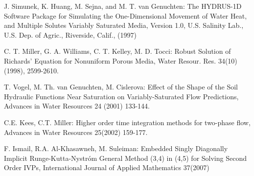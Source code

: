 \documentclass[final,3p,times,twocolumn]{elsarticle}
\begin{document}
\begin{thebibliography}{00}
 J. Simunek, K. Huang, M. Sejna, and M. T. van Genuchten: The HYDRUS-1D Software Package for Simulating the One-Dimensional
Movement of Water Heat, and Multiple Solutes Variably Saturated Media, Version 1.0, U.S. Salinity Lab., U.S. Dep. of Agric.,
Riverside, Calif., (1997)

 C. T. Miller, G. A. Williams, C. T. Kelley, M. D. Tocci: Robust Solution of Richards' Equation for Nonuniform Porous Media, Water Resour. Res. 34(10) (1998), 2599-2610.

 T. Vogel, M. Th. van Genuchten, M. Cislerova: Effect of the Shape of the Soil Hydraulic Functions Near Saturation on
Variably-Saturated Flow Predictions, Advances in Water Resources 24 (2001) 133-144.

 C.E. Kees, C.T. Miller: Higher order time integration methods for two-phase flow, Advances in Water Resources 25(2002) 159-177.

 F. Ismail, R.A. Al-Khasawneh, M. Suleiman: Embedded Singly Diagonally Implicit Runge-Kutta-Nystr\'om General Method (3,4) in (4,5) for Solving Second Order IVPs, International Journal of Applied Mathematics 37(2007)


 \end{thebibliography}
\end{document}
